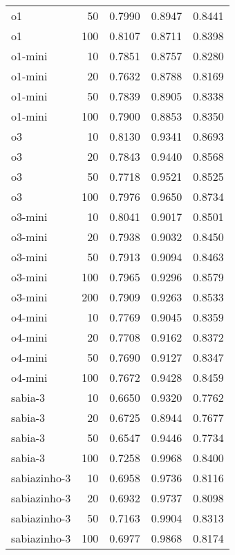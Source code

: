 \begin{tabular}{lrrrr}
o1 & 50 & 0.7990 & 0.8947 & 0.8441 \\
o1 & 100 & 0.8107 & 0.8711 & 0.8398 \\
o1-mini & 10 & 0.7851 & 0.8757 & 0.8280 \\
o1-mini & 20 & 0.7632 & 0.8788 & 0.8169 \\
o1-mini & 50 & 0.7839 & 0.8905 & 0.8338 \\
o1-mini & 100 & 0.7900 & 0.8853 & 0.8350 \\
o3 & 10 & 0.8130 & 0.9341 & 0.8693 \\
o3 & 20 & 0.7843 & 0.9440 & 0.8568 \\
o3 & 50 & 0.7718 & 0.9521 & 0.8525 \\
o3 & 100 & 0.7976 & 0.9650 & 0.8734 \\
o3-mini & 10 & 0.8041 & 0.9017 & 0.8501 \\
o3-mini & 20 & 0.7938 & 0.9032 & 0.8450 \\
o3-mini & 50 & 0.7913 & 0.9094 & 0.8463 \\
o3-mini & 100 & 0.7965 & 0.9296 & 0.8579 \\
o3-mini & 200 & 0.7909 & 0.9263 & 0.8533 \\
o4-mini & 10 & 0.7769 & 0.9045 & 0.8359 \\
o4-mini & 20 & 0.7708 & 0.9162 & 0.8372 \\
o4-mini & 50 & 0.7690 & 0.9127 & 0.8347 \\
o4-mini & 100 & 0.7672 & 0.9428 & 0.8459 \\
sabia-3 & 10 & 0.6650 & 0.9320 & 0.7762 \\
sabia-3 & 20 & 0.6725 & 0.8944 & 0.7677 \\
sabia-3 & 50 & 0.6547 & 0.9446 & 0.7734 \\
sabia-3 & 100 & 0.7258 & 0.9968 & 0.8400 \\
sabiazinho-3 & 10 & 0.6958 & 0.9736 & 0.8116 \\
sabiazinho-3 & 20 & 0.6932 & 0.9737 & 0.8098 \\
sabiazinho-3 & 50 & 0.7163 & 0.9904 & 0.8313 \\
sabiazinho-3 & 100 & 0.6977 & 0.9868 & 0.8174 \\
\bottomrule
\end{tabular}
